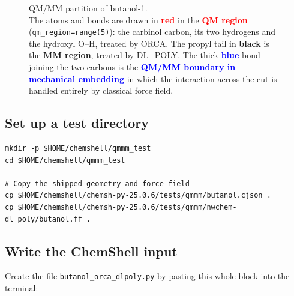 \documentclass[12pt,a4paper]{article}
\begin{document}
\begin{figure}[ht]
\centering
{}
\captionsetup{width=0.70\textwidth}
\caption{QM/MM partition of butanol-1.\\ The atoms and bonds are drawn in \textcolor{red}{\textbf{red}}
in the \textcolor{red}{\textbf{QM region}} (\texttt{qm\_region=range(5)}): the carbinol
carbon, its two hydrogens and the hydroxyl O--H, treated by ORCA. The propyl tail in \textbf{black} is the \textbf{MM region}, treated by DL\_POLY. The thick \textcolor{blue}{\textbf{blue}} bond joining the two carbons is the \textcolor{blue}{\textbf{QM/MM
boundary in mechanical embedding}} in which the interaction across the cut is handled
entirely by classical force field.}
\label{fig:butanol_qmmm}
\end{figure}

\subsection{Set up a test directory}

\begin{lstlisting}[style=shell]
mkdir -p $HOME/chemshell/qmmm_test
cd $HOME/chemshell/qmmm_test

# Copy the shipped geometry and force field
cp $HOME/chemshell/chemsh-py-25.0.6/tests/qmmm/butanol.cjson .
cp $HOME/chemshell/chemsh-py-25.0.6/tests/qmmm/nwchem-dl_poly/butanol.ff .
\end{lstlisting}

\subsection{Write the ChemShell input}

Create the file \texttt{butanol\_orca\_dlpoly.py} by pasting this whole block into
the terminal:
\end{document}
